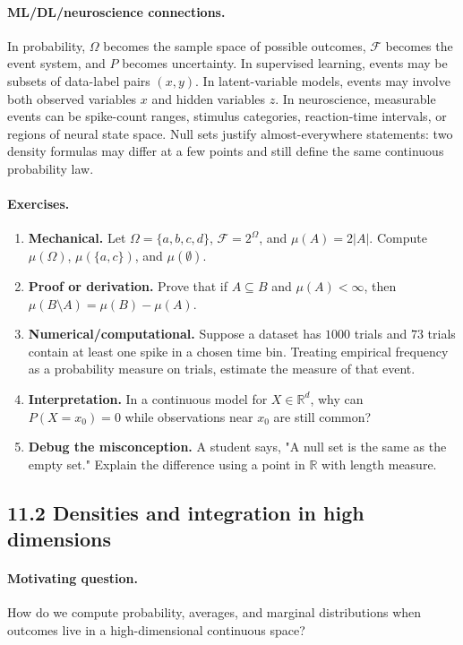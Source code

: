 \paragraph{ML/DL/neuroscience connections.}
In probability, \(\Omega\) becomes the sample space of possible outcomes, \(\mathcal{F}\) becomes the event system, and \(P\) becomes uncertainty. In supervised learning, events may be subsets of data-label pairs \((x,y)\). In latent-variable models, events may involve both observed variables \(x\) and hidden variables \(z\). In neuroscience, measurable events can be spike-count ranges, stimulus categories, reaction-time intervals, or regions of neural state space. Null sets justify almost-everywhere statements: two density formulas may differ at a few points and still define the same continuous probability law.

\paragraph{Exercises.}
\begin{enumerate}[label=\textbf{11.1.\arabic*.}, leftmargin=*]
\item \textbf{Mechanical.} Let \(\Omega=\{a,b,c,d\}\), \(\mathcal{F}=2^\Omega\), and \(\mu(A)=2|A|\). Compute \(\mu(\Omega)\), \(\mu(\{a,c\})\), and \(\mu(\emptyset)\).
\item \textbf{Proof or derivation.} Prove that if \(A\subseteq B\) and \(\mu(A)<\infty\), then \(\mu(B\setminus A)=\mu(B)-\mu(A)\).
\item \textbf{Numerical/computational.} Suppose a dataset has \(1000\) trials and \(73\) trials contain at least one spike in a chosen time bin. Treating empirical frequency as a probability measure on trials, estimate the measure of that event.
\item \textbf{Interpretation.} In a continuous model for \(X\in\mathbb{R}^d\), why can \(P(X=x_0)=0\) while observations near \(x_0\) are still common?
\item \textbf{Debug the misconception.} A student says, "A null set is the same as the empty set." Explain the difference using a point in \(\mathbb{R}\) with length measure.
\end{enumerate}

\subsection{11.2 Densities and integration in high dimensions}

\paragraph{Motivating question.}
How do we compute probability, averages, and marginal distributions when outcomes live in a high-dimensional continuous space?


